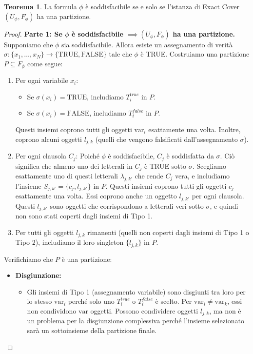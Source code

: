 \documentclass[a4paper]{article}
\theoremstyle{definition} %
\newtheorem{theorem}{Teorema}
\begin{document}
\begin{theorem}
La formula $\phi$ è soddisfacibile se e solo se l'istanza di Exact Cover $(U_\phi, F_\phi)$ ha una partizione.
\end{theorem}
\begin{proof}
\textbf{Parte 1: Se $\phi$ è soddisfacibile $\implies (U_\phi, F_\phi)$ ha una partizione.}
Supponiamo che $\phi$ sia soddisfacibile. Allora esiste un assegnamento di verità $\sigma: \{x_1, \ldots, x_N\} \to \{\text{TRUE}, \text{FALSE}\}$ tale che $\phi$ è TRUE. Costruiamo una partizione $P \subseteq F_\phi$ come segue:
\begin{enumerate}
    \item Per ogni variabile $x_i$:
    \begin{itemize}
        \item Se $\sigma(x_i) = \text{TRUE}$, includiamo $T_i^{true}$ in $P$.
        \item Se $\sigma(x_i) = \text{FALSE}$, includiamo $T_i^{false}$ in $P$.
    \end{itemize}
    Questi insiemi coprono tutti gli oggetti $\text{var}_i$ esattamente una volta. Inoltre, coprono alcuni oggetti $l_{j,k}$ (quelli che vengono falsificati dall'assegnamento $\sigma$).
    \item Per ogni clausola $C_j$:
    Poiché $\phi$ è soddisfacibile, $C_j$ è soddisfatta da $\sigma$. Ciò significa che almeno uno dei letterali in $C_j$ è TRUE sotto $\sigma$. Scegliamo esattamente uno di questi letterali $\lambda_{j,k'}$ che rende $C_j$ vera, e includiamo l'insieme $S_{j,k'} = \{c_j, l_{j,k'}\}$ in $P$.
    Questi insiemi coprono tutti gli oggetti $c_j$ esattamente una volta. Essi coprono anche un oggetto $l_{j,k'}$ per ogni clausola. Questi $l_{j,k'}$ sono oggetti che corrispondono a letterali veri sotto $\sigma$, e quindi non sono stati coperti dagli insiemi di Tipo 1.
    \item Per tutti gli oggetti $l_{j,k}$ rimanenti (quelli non coperti dagli insiemi di Tipo 1 o Tipo 2), includiamo il loro singleton $\{l_{j,k}\}$ in $P$.
\end{enumerate}
Verifichiamo che $P$ è una partizione:
\begin{itemize}
    \item \textbf{Disgiunzione:}
    \begin{itemize}
        \item Gli insiemi di Tipo 1 (assegnamento variabile) sono disgiunti tra loro per lo stesso $\text{var}_i$ perché solo uno $T_i^{true}$ o $T_i^{false}$ è scelto. Per $\text{var}_i \ne \text{var}_k$, essi non condividono $\text{var}$ oggetti. Possono condividere oggetti $l_{j,k}$, ma non è un problema per la disgiunzione complessiva perché l'insieme selezionato sarà un sottoinsieme della partizione finale.

\end{itemize}
\end{itemize}
\end{proof}
\end{document}
